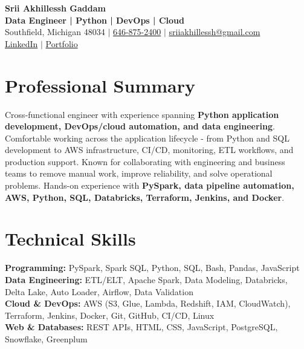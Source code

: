 \documentclass[letterpaper,10pt]{article}
\begin{document}
\fontsize{9.35pt}{10.45pt}\selectfont

\begin{center}
    {\LARGE \textbf{Srii Akhillessh Gaddam}} \\[-1pt]
    \textbf{Data Engineer | Python | DevOps | Cloud} \\[2pt]
    Southfield, Michigan 48034 $|$
    \href{tel:6468752400}{646-875-2400} $|$
    \href{mailto:sriiakhillessh@gmail.com}{sriiakhillessh@gmail.com} \\[1pt]
    \href{https://www.linkedin.com/in/srii-akhiilessh-gaddam-b48668191/}{LinkedIn} $|$
    \href{https://sriiakhillesshg.github.io/portfolio/}{Portfolio}
\end{center}
\vspace{-8pt}

\section{Professional Summary}
\small{Cross-functional engineer with experience spanning \textbf{Python application development, DevOps/cloud automation, and data engineering}. Comfortable working across the application lifecycle - from Python and SQL development to AWS infrastructure, CI/CD, monitoring, ETL workflows, and production support. Known for collaborating with engineering and business teams to remove manual work, improve reliability, and solve operational problems. Hands-on experience with \textbf{PySpark, data pipeline automation, AWS, Python, SQL, Databricks, Terraform, Jenkins, and Docker}.}

\section{Technical Skills}
\small{
\textbf{Programming:} PySpark, Spark SQL, Python, SQL, Bash, Pandas, JavaScript \\
\textbf{Data Engineering:} ETL/ELT, Apache Spark, Data Modeling, Databricks, Delta Lake, Auto Loader, Airflow, Data Validation \\
\textbf{Cloud \& DevOps:} AWS (S3, Glue, Lambda, Redshift, IAM, CloudWatch), Terraform, Jenkins, Docker, Git, GitHub, CI/CD, Linux \\
\textbf{Web \& Databases:} REST APIs, HTML, CSS, JavaScript, PostgreSQL, Snowflake, Greenplum
}

\end{document}
